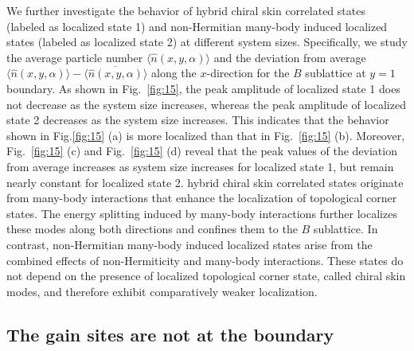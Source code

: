 \documentclass[longbibliography, aps, prx, amsmath, amssymb, amsfonts, twocolumn,superscriptaddress, footinbib]{revtex4-1}
\begin{document}
	We further investigate the behavior of hybrid chiral skin correlated states (labeled as localized state 1) and non-Hermitian many-body induced localized states (labeled as localized state 2) at different system sizes. Specifically, we study the average particle number $\langle \hat{n}(x, y, \alpha) \rangle$ and the deviation from average $\langle \hat{n}(x, y, \alpha) \rangle - \overline{\langle \hat{n}(x, y, \alpha) \rangle}$ along the $x$-direction for the $B$ sublattice at $y = 1$ boundary.
	As shown in Fig.~\ref{fig:15}, the peak amplitude of localized state 1 does not decrease as the system size increases, whereas the peak amplitude of localized state 2 decreases as the system size increases. This indicates that the behavior shown in Fig.\ref{fig:15} (a) is more localized than that in Fig.~\ref{fig:15} (b).
	Moreover, Fig.~\ref{fig:15} (c) and Fig.~\ref{fig:15} (d) reveal that the peak values of the deviation from average increases as system size increases for localized state 1, but remain nearly constant for localized state 2.
	hybrid chiral skin correlated states originate from many-body interactions that enhance the localization of topological corner states. 
	The energy splitting induced by many-body interactions further localizes these modes along both directions and confines them to the $B$ sublattice.
	In contrast, non-Hermitian many-body induced localized states arise from the combined effects of non-Hermiticity and many-body interactions. These states do not depend on the presence of localized topological corner state, called chiral skin modes, and therefore exhibit comparatively weaker localization.

	\subsection{The gain sites are not at the boundary}

\end{document}
